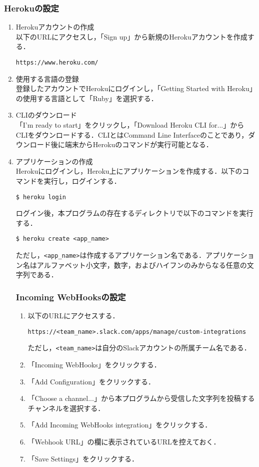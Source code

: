 \documentclass[12pt]{jsarticle}
\begin{document}
\subsubsection{Herokuの設定}\label{heroku}
\begin{enumerate}
\item Herokuアカウントの作成\\
  以下のURLにアクセスし，「Sign up」から新規のHerokuアカウントを作成する．
\begin{verbatim}
https://www.heroku.com/
\end{verbatim}
\item 使用する言語の登録\\
  登録したアカウントでHerokuにログインし，「Getting Started with Heroku」の使用する言語として「Ruby」を選択する．
\item CLIのダウンロード\\
  「I'm ready to start」をクリックし，「Download Heroku CLI for...」からCLIをダウンロードする．CLIとはCommand Line Interfaceのことであり，ダウンロード後に端末からHerokuのコマンドが実行可能となる．
\item アプリケーションの作成\\
  Herokuにログインし，Heroku上にアプリケーションを作成する．以下のコマンドを実行し，ログインする．
\begin{verbatim}
$ heroku login
\end{verbatim}
ログイン後，本プログラムの存在するディレクトリで以下のコマンドを実行する．
\begin{verbatim}
$ heroku create <app_name>
\end{verbatim}
ただし，\verb|<app_name>|は作成するアプリケーション名である．アプリケーション名はアルファベット小文字，数字，およびハイフンのみからなる任意の文字列である．

\subsubsection{Incoming WebHooksの設定}\label{incom}
\begin{enumerate}
\item 以下のURLにアクセスする．
\begin{verbatim}
https://<team_name>.slack.com/apps/manage/custom-integrations
\end{verbatim}
ただし，\verb|<team_name>|は自分のSlackアカウントの所属チーム名である．
\item 「Incoming WebHooks」をクリックする．
\item 「Add Configuration」をクリックする．
\item 「Choose a channel...」から本プログラムから受信した文字列を投稿するチャンネルを選択する．
\item 「Add Incoming WebHooks integration」をクリックする．
\item 「Webhook URL」の欄に表示されているURLを控えておく．
\item 「Save Settings」をクリックする．
\end{enumerate}

\end{enumerate}
\end{document}
